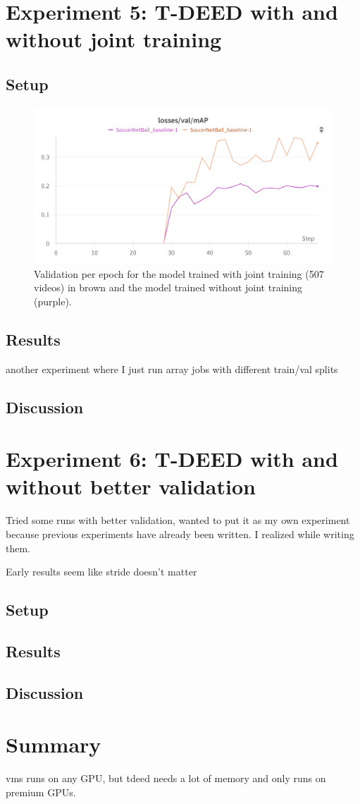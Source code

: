 \section{Experiment 5: T-DEED with and without joint training}
\subsection{Setup}
\label{ssec:ex5_setup}
\begin{figure}
    \centering
    \includegraphics[width=0.75\linewidth]{figures/500_7_val_compare.png}
    \caption{Validation per epoch for the model trained with joint training (507 videos) in brown and the model trained without joint training (purple).}
    \label{fig:500_7_val_compare}
\end{figure}


\subsection{Results}
\label{ssec:ex5_results}


another experiment where I just run array jobs with different train/val splits

\subsection{Discussion}
\label{ssec:ex5_discussion}

\section{Experiment 6: T-DEED with and without better validation}

Tried some runs with better validation, wanted to put it as my own experiment because previous experiments have already been written. I realized while writing them.

Early results seem like stride doesn't matter
\subsection{Setup}
\label{ssec:ex6_setup}


\subsection{Results}
\label{ssec:ex6_results}



\subsection{Discussion}
\label{ssec:ex6_discussion}



\section{Summary}
vms runs on any GPU, but tdeed needs a lot of memory and only runs on premium GPUs.